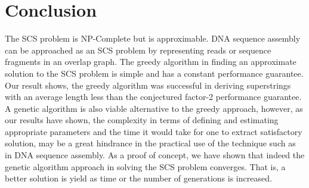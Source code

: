 \chapter{Conclusion}

The SCS problem is NP-Complete but is approximable.
DNA sequence assembly can be approached as an SCS problem by representing
reads or sequence fragments in an overlap graph.
The greedy algorithm in finding an approximate solution to the SCS problem
is simple and has a constant performance guarantee. Our result shows, 
the greedy algorithm was successful in deriving superstrings with 
an average length less than the conjectured factor-2 performance guarantee.
A genetic algorithm is also viable alternative to the greedy approach,
however, as our results have shown, the complexity in terms of defining and estimating
appropriate parameters and the time it would take for one to extract satisfactory solution, 
may be a great hindrance in the practical use of the technique
such as in DNA sequence assembly.
As a proof of concept, we have shown that indeed the genetic algorithm approach
in solving the SCS problem converges. That is, a better solution
is yield as time or the number of generations is increased. 